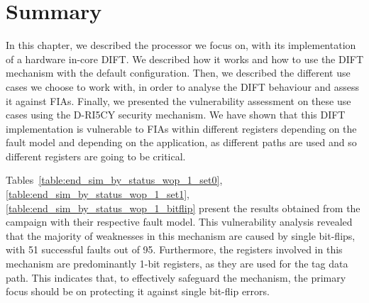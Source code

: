 \section{Summary}
In this chapter, we described the processor we focus on, with its implementation of a hardware in-core DIFT. We described how it works and how to use the DIFT mechanism with the default configuration. Then, we described the different use cases we choose to work with, in order to analyse the DIFT behaviour and assess it against FIAs. Finally, we presented the vulnerability assessment on these use cases using the D-RI5CY security mechanism. We have shown that this DIFT implementation is vulnerable to FIAs within different registers depending on the fault model and depending on the application, as different paths are used and so different registers are going to be critical.

Tables~\ref{table:end_sim_by_status_wop_1_set0}, \ref{table:end_sim_by_status_wop_1_set1}, \ref{table:end_sim_by_status_wop_1_bitflip} present the results obtained from the campaign with their respective fault model.
This vulnerability analysis revealed that the majority of weaknesses in this mechanism are caused by single bit-flips, with 51 successful faults out of 95. Furthermore, the registers involved in this mechanism are predominantly 1-bit registers, as they are used for the tag data path. This indicates that, to effectively safeguard the mechanism, the primary focus should be on protecting it against single bit-flip errors.

